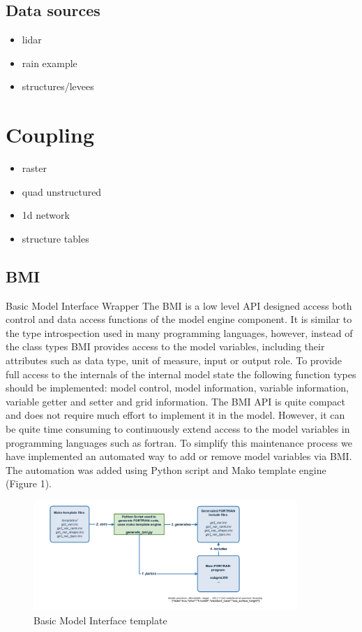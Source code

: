 \documentclass[a4paper]{article}
\begin{document}
\subsection{Data sources }
\begin{itemize}
  \item lidar
  \item rain example
  \item structures/levees
\end{itemize}

\section{Coupling}
\label{sec:coupling}

\begin{itemize}
  \item raster
  \item quad unstructured
  \item 1d network
  \item structure tables
\end{itemize}

\subsection{BMI}

Basic Model Interface Wrapper
The \ac{BMI} is a low level API designed access both control and data access functions of the model engine component. It is similar to the type introspection used in many programming languages, however, instead of the class types \ac{BMI} provides access to the model variables, including their attributes such as data type, unit of measure, input or output role. To provide full access to the internals of the internal model state the following function types should be implemented: model control, model information, variable information, variable getter and setter and grid information. The \ac{BMI} API is quite compact and does not require much effort to implement it in the model. However, it can be quite time consuming to continuously extend access to the model variables in programming languages such as fortran. To simplify this maintenance process we have implemented an automated way to add or remove model variables via \ac{BMI}. The automation was added using Python script and Mako template engine (Figure 1).


\begin{figure}[h]
  \centering
  \includegraphics[width=10cm]{bmi_3di}
  \caption{Basic Model Interface template}
  \label{fig:bmi}
\end{figure}
\end{document}
